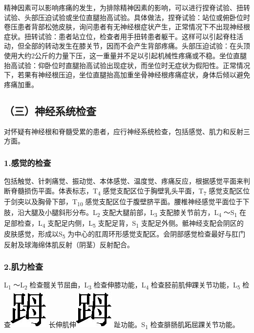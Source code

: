 精神因素可以影响疼痛的发生，为排除精神因素的影响，可以进行捏脊试验、扭转试验、头部压迫试验或坐位直腿抬高试验。具体做法，捏脊试验：站位或俯卧位时卷压患者背部松弛皮肤，询问患者有无神经根症状产生，正常情况下不出现神经根症状。扭转试验：患者站立位，检查者用手扭转患者躯干。这样可以引起脊柱活动，但全部的转动发生在膝关节，因而不会产生背部疼痛。头部压迫试验：在头顶使用大约2公斤的力量下压，这一重量并不足以引起机械性疼痛或不稳。坐位直腿抬高试验：仰卧位时直腿抬高试验出现症状，而坐位时无症状为假阳性。正常情况下，若果有神经根压迫，坐位直腿抬高加重坐骨神经根疼痛症状，身体后倾以避免疼痛加重。

\subsection{（三）神经系统检查}

对怀疑有神经根和脊髓受累的患者，应行神经系统检查，包括感觉、肌力和反射三方面。

\subsubsection{1.感觉的检查}

包括触觉、针刺痛觉、振动觉、本体感觉、温度觉、疼痛反应，根据感觉平面来判断脊髓损伤平面。体表标志，T\textsubscript{4}
感觉支配区位于胸壁乳头平面，T\textsubscript{7}
感觉支配区位于剑突以及胸骨下部，T\textsubscript{10}
感觉支配区位于腹壁脐平面。腰椎神经感觉平面位于下肢，沿大腿及小腿斜形分布。L\textsubscript{2}
支配大腿前部，L\textsubscript{3} 支配膝关节前方，L\textsubscript{4}
～S\textsubscript{1} 在足部检查，L\textsubscript{4}
支配足内侧，L\textsubscript{5} 支配足背，S\textsubscript{1}
支配足外侧。骶神经支配会阴区的皮肤感觉，形成以S\textsubscript{5}
为中心的肛周环形感觉支配区。会阴部感觉检查最好与肛门反射及球海绵体肌反射（阴茎）反射配合。

\subsubsection{2.肌力检查}

L\textsubscript{1} ～L\textsubscript{2}
检查髋关节屈曲，L\textsubscript{3} 检查伸膝功能，L\textsubscript{4}
检查胫前肌伸踝关节功能，L\textsubscript{5}
检查\includegraphics{./images/Image00266.jpg}
长伸肌伸\includegraphics{./images/Image00267.jpg}
趾功能。S\textsubscript{1} 检查腓肠肌跖屈踝关节功能。

